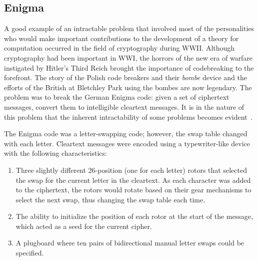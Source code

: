 \subsection{Enigma}\label{sec:sub:enigma}

A good example of an intractable problem that involved most of the personalities who would make important
contributions to the development of a theory for computation occurred in the field of cryptography during WWII.
Although cryptography had been important in WWI, the horrors of the new era of warfare instigated by Hitler's Third
Reich brought the importance of codebreaking to the forefront.  The story of the Polish code breakers and their
\emph{bombe} device and the efforts of the British at Bletchley Park using the bombes are now legendary.  The
problem was to break the German Enigma code: given a set of ciphertext messages, convert them to intelligible
cleartext messages.  It is in the nature of this problem that the inherent intractability of some problems becomes
evident~\cite{dturing}.

The Enigma code was a letter-swapping code; however, the swap table changed with each letter.  Cleartext messages
were encoded using a typewriter-like device with the following characteristics:

\begin{enumerate}
\item Three slightly different 26-position (one for each letter) rotors that selected the swap for the current
  letter in the cleartext.  As each character was added to the ciphertext, the rotors would rotate based on their
  gear mechanisms to select the next swap, thus changing the swap table each time.
\item The ability to initialize the position of each rotor at the start of the message, which acted as a seed for the
  current cipher.
\item A plugboard where ten pairs of bidirectional manual letter swaps could be specified.
\end{enumerate}

